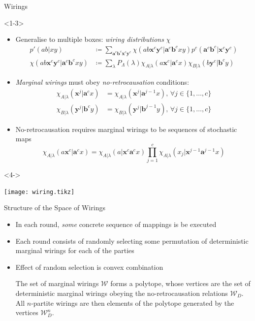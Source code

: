 \documentclass[xcolor=dvipsnames]{beamer}
\newcommand{\dintv}[2]{\mathopen\{#1,\ldots,#2\mathclose\}}
\newcommand{\?}{\mathrel{?}} %
\newcommand{\cvec}[1]{\boldsymbol{\mathbf{#1}}}    %
\newcommand{\sW}{\mathcal{W}}
\begin{document}
\begin{frame}{Wirings}
  \begin{onlyenv}<1-3>
    \begin{itemize}[<+->]
      \item Generalise to multiple boxes: \emph{wiring distributions} \(\chi\)
        \begin{align*}
          p'(ab|xy) &\coloneqq \sum_{\cvec{a}^c\cvec{b}^c\cvec{x}^c\cvec{y}^c} \chi(ab\cvec{x}^c\cvec{y}^c|\cvec{a}^c\cvec{b}^cxy) p^c(\cvec{a}^c\cvec{b}^c|\cvec{x}^c\cvec{y}^c)\label{eqn:jwirdistdef} \\
          \chi(ab\cvec{x}^c\cvec{y}^c|\cvec{a}^c\cvec{b}^cxy) &\coloneqq \sum_{\lambda} P_{\Lambda}(\lambda) \chi_{A|\lambda}(a\cvec{x}^c|\cvec{a}^cx) \chi_{B|\lambda}(b\cvec{y}^c|\cvec{b}^cy)
        \end{align*}
      \item \emph{Marginal wirings} must obey \emph{no-retrocausation} conditions:
        \begin{align*}
          \chi_{A|\lambda}(\cvec{x}^j|\cvec{a}^cx) &= \chi_{A|\lambda}(\cvec{x}^j|\cvec{a}^{j-1}x),\,\forall j \in \dintv{1}{c} \\
          \chi_{B|\lambda}(\cvec{y}^j|\cvec{b}^cy) &= \chi_{B|\lambda}(\cvec{y}^j|\cvec{b}^{j-1}y),\,\forall j \in \dintv{1}{c}
        \end{align*}
      \item No-retrocausation requires marginal wirings to be sequences of stochastic maps
        \[ \chi_{A|\lambda}(a\cvec{x}^c|\cvec{a}^cx) = \chi_{A|\lambda}(a|\cvec{x}^c\cvec{a}^{c}x) \prod_{j=1}^c \chi_{A|\lambda}(x_j|\cvec{x}^{j-1}\cvec{a}^{j-1}x) \]
    \end{itemize}
  \end{onlyenv}
  \begin{onlyenv}<4->
    \begin{center}
      \texttt{[image: wiring.tikz]}
    \end{center}
  \end{onlyenv}
\end{frame}

\begin{frame}{Structure of the Space of Wirings}
  \begin{itemize}[<+->]
    \item In each round, \emph{some} concrete sequence of mappings is be executed
    \item Each round consists of randomly selecting some permutation of deterministic marginal wirings for each of the parties
    \item Effect of random selection is convex combination
      \begin{theorem}
        The set of marginal wirings \(\sW\) forms a polytope, whose vertices are the set of deterministic marginal wirings obeying the no-retrocausation relations \(\sW_D\). All \(n\)-partite wirings are then elements of the polytope generated by the vertices \(\sW_D^n\).
      \end{theorem}
  \end{itemize}
\end{frame}
\end{document}
